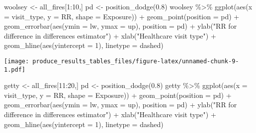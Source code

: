 \documentclass[
]{article}
\newenvironment{Shaded}{\begin{snugshade}}{\end{snugshade}}
\newcommand{\AttributeTok}[1]{\textcolor[rgb]{0.77,0.63,0.00}{#1}}
\newcommand{\DecValTok}[1]{\textcolor[rgb]{0.00,0.00,0.81}{#1}}
\newcommand{\FloatTok}[1]{\textcolor[rgb]{0.00,0.00,0.81}{#1}}
\newcommand{\FunctionTok}[1]{\textcolor[rgb]{0.00,0.00,0.00}{#1}}
\newcommand{\NormalTok}[1]{#1}
\newcommand{\OtherTok}[1]{\textcolor[rgb]{0.56,0.35,0.01}{#1}}
\newcommand{\SpecialCharTok}[1]{\textcolor[rgb]{0.00,0.00,0.00}{#1}}
\newcommand{\StringTok}[1]{\textcolor[rgb]{0.31,0.60,0.02}{#1}}
\begin{document}
\begin{Shaded}
\begin{Highlighting}[]
\NormalTok{woolsey }\OtherTok{\textless{}{-}}\NormalTok{ all\_fires[}\DecValTok{1}\SpecialCharTok{:}\DecValTok{10}\NormalTok{,]}
\NormalTok{pd }\OtherTok{\textless{}{-}} \FunctionTok{position\_dodge}\NormalTok{(}\FloatTok{0.8}\NormalTok{)}
\NormalTok{woolsey }\SpecialCharTok{\%\textgreater{}\%} \FunctionTok{ggplot}\NormalTok{(}\FunctionTok{aes}\NormalTok{(}\AttributeTok{x =}\NormalTok{ visit\_type, }\AttributeTok{y =}\NormalTok{ RR, }
                       \AttributeTok{shape =}\NormalTok{ Exposure)) }\SpecialCharTok{+} \FunctionTok{geom\_point}\NormalTok{(}\AttributeTok{position =}\NormalTok{ pd) }\SpecialCharTok{+}
  \FunctionTok{geom\_errorbar}\NormalTok{(}\FunctionTok{aes}\NormalTok{(}\AttributeTok{ymin =}\NormalTok{ lw, }\AttributeTok{ymax =}\NormalTok{ up), }\AttributeTok{position =}\NormalTok{ pd) }\SpecialCharTok{+} 
  \FunctionTok{ylab}\NormalTok{(}\StringTok{"RR for difference in differences estimator"}\NormalTok{) }\SpecialCharTok{+} 
  \FunctionTok{xlab}\NormalTok{(}\StringTok{"Healthcare visit type"}\NormalTok{) }\SpecialCharTok{+}
  \FunctionTok{geom\_hline}\NormalTok{(}\FunctionTok{aes}\NormalTok{(}\AttributeTok{yintercept =} \DecValTok{1}\NormalTok{), }\AttributeTok{linetype =} \StringTok{\textquotesingle{}dashed\textquotesingle{}}\NormalTok{)}
\end{Highlighting}
\end{Shaded}

\texttt{[image: produce\_results\_tables\_files/figure-latex/unnamed-chunk-9-1.pdf]}

\begin{Shaded}
\begin{Highlighting}[]
\NormalTok{getty }\OtherTok{\textless{}{-}}\NormalTok{ all\_fires[}\DecValTok{11}\SpecialCharTok{:}\DecValTok{20}\NormalTok{,]}
\NormalTok{pd }\OtherTok{\textless{}{-}} \FunctionTok{position\_dodge}\NormalTok{(}\FloatTok{0.8}\NormalTok{)}
\NormalTok{getty }\SpecialCharTok{\%\textgreater{}\%} \FunctionTok{ggplot}\NormalTok{(}\FunctionTok{aes}\NormalTok{(}\AttributeTok{x =}\NormalTok{ visit\_type, }\AttributeTok{y =}\NormalTok{ RR, }
                       \AttributeTok{shape =}\NormalTok{ Exposure)) }\SpecialCharTok{+} \FunctionTok{geom\_point}\NormalTok{(}\AttributeTok{position =}\NormalTok{ pd) }\SpecialCharTok{+}
  \FunctionTok{geom\_errorbar}\NormalTok{(}\FunctionTok{aes}\NormalTok{(}\AttributeTok{ymin =}\NormalTok{ lw, }\AttributeTok{ymax =}\NormalTok{ up), }\AttributeTok{position =}\NormalTok{ pd) }\SpecialCharTok{+} 
  \FunctionTok{ylab}\NormalTok{(}\StringTok{"RR for difference in differences estimator"}\NormalTok{) }\SpecialCharTok{+} 
  \FunctionTok{xlab}\NormalTok{(}\StringTok{"Healthcare visit type"}\NormalTok{) }\SpecialCharTok{+}
  \FunctionTok{geom\_hline}\NormalTok{(}\FunctionTok{aes}\NormalTok{(}\AttributeTok{yintercept =} \DecValTok{1}\NormalTok{), }\AttributeTok{linetype =} \StringTok{\textquotesingle{}dashed\textquotesingle{}}\NormalTok{)}
\end{Highlighting}
\end{Shaded}
\end{document}
